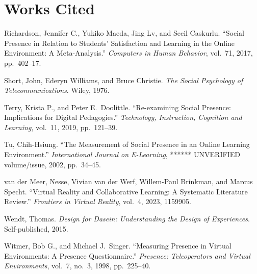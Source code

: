 \documentclass{article}
\newenvironment{workscited}
  {\section*{Works Cited}\begin{list}{}
    {\setlength{\itemindent}{-0.5in}\setlength{\leftmargin}{0.5in}
     \setlength{\itemsep}{0pt}\setlength{\parsep}{6pt}}}
  {\end{list}}
\begin{document}
\begin{workscited}
\item Richardson, Jennifer C., Yukiko Maeda, Jing Lv, and Secil Caskurlu.
``Social Presence in Relation to Students' Satisfaction and Learning in
the Online Environment: A Meta-Analysis.'' \textit{Computers in Human
Behavior}, vol.~71, 2017, pp.~402--17. %

\item Short, John, Ederyn Williams, and Bruce Christie. \textit{The
Social Psychology of Telecommunications}. Wiley, 1976. %

\item Terry, Krista P., and Peter E.\ Doolittle. ``Re-examining Social
Presence: Implications for Digital Pedagogies.'' \textit{Technology,
Instruction, Cognition and Learning}, vol.~11, 2019, pp.~121--39.

\item Tu, Chih-Hsiung. ``The Measurement of Social Presence in an Online
Learning Environment.'' \textit{International Journal on E-Learning},
****** UNVERIFIED volume/issue, 2002, pp.~34--45.

\item van der Meer, Nesse, Vivian van der Werf, Willem-Paul Brinkman,
and Marcus Specht. ``Virtual Reality and Collaborative Learning: A
Systematic Literature Review.'' \textit{Frontiers in Virtual Reality},
vol.~4, 2023, 1159905. %

\item Wendt, Thomas. \textit{Design for Dasein: Understanding the Design
of Experiences}. Self-published, 2015.

\item Witmer, Bob G., and Michael J.\ Singer. ``Measuring Presence in
Virtual Environments: A Presence Questionnaire.'' \textit{Presence:
Teleoperators and Virtual Environments}, vol.~7, no.~3, 1998,
pp.~225--40. %

\end{workscited}
\end{document}
